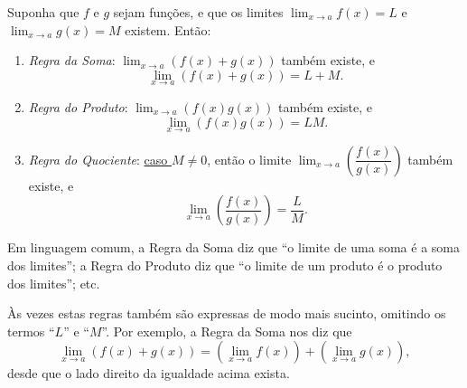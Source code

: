 \begin{theorem}
Suponha que $f$ e $g$ sejam funções, e que os limites $\lim_{x\to a}f(x)=L$ e $\lim_{x\to a}g(x)=M$ existem. Então:
\begin{enumerate}
	\item \emph{Regra da Soma}: $\lim_{x\to a}(f(x)+g(x))$ também existe, e
	\[\lim_{x\to a}(f(x)+g(x))=L+M.\]
	\item \emph{Regra do Produto}: $\lim_{x\to a}(f(x)g(x))$ também existe, e
	\[\lim_{x\to a}\left(f(x)g(x)\right)=LM.\]
	\item \emph{Regra do Quociente}: \uline{caso $M\neq 0$}, então o limite $\lim_{x\to a}\left(\dfrac{f(x)}{g(x)}\right)$ também existe, e
	\[\lim_{x\to a}\left(\dfrac{f(x)}{g(x)}\right)=\dfrac{L}{M}.\]
\end{enumerate}
\end{theorem}
	
Em linguagem comum, a Regra da Soma diz que ``o limite de uma soma é a soma dos limites''; a Regra do Produto diz que ``o limite de um produto é o produto dos limites''; etc.

Às vezes estas regras também são expressas de modo mais sucinto, omitindo os termos ``$L$'' e ``$M$''. Por exemplo, a Regra da Soma nos diz que
\[\lim_{x\to a}(f(x)+g(x))=\left(\lim_{x\to a}f(x)\right)+\left(\lim_{x\to a}g(x)\right),\]
desde que o lado direito da igualdade acima exista.

